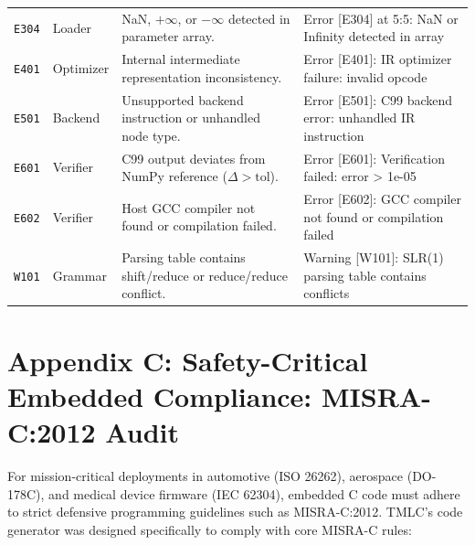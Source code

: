 \documentclass[11pt,a4paper]{article}
\begin{document}
\begin{center}
{\begin{tabular}{ll >{\raggedright\arraybackslash}p{6.8cm} >{\raggedright\arraybackslash\ttfamily\scriptsize}p{6.0cm}}
\texttt{E304} & Loader   & NaN, $+\infty$, or $-\infty$ detected in parameter array. & Error [E304] at 5:5: NaN or Infinity detected in array \\
\texttt{E401} & Optimizer& Internal intermediate representation inconsistency. & Error [E401]: IR optimizer failure: invalid opcode \\
\texttt{E501} & Backend  & Unsupported backend instruction or unhandled node type. & Error [E501]: C99 backend error: unhandled IR instruction \\
\texttt{E601} & Verifier & C99 output deviates from NumPy reference ($\Delta > \text{tol}$). & Error [E601]: Verification failed: error > 1e-05 \\
\texttt{E602} & Verifier & Host GCC compiler not found or compilation failed. & Error [E602]: GCC compiler not found or compilation failed \\
\texttt{W101} & Grammar  & Parsing table contains shift/reduce or reduce/reduce conflict. & Warning [W101]: SLR(1) parsing table contains conflicts \\
\bottomrule
\end{tabular}%
}
\end{center}


\newpage
\section{Appendix C: Safety-Critical Embedded Compliance: MISRA-C:2012 Audit}
\label{app:misra_audit}

For mission-critical deployments in automotive (ISO 26262), aerospace (DO-178C), and medical device firmware (IEC 62304), embedded C code must adhere to strict defensive programming guidelines such as MISRA-C:2012. TMLC's code generator was designed specifically to comply with core MISRA-C rules:
\end{document}
